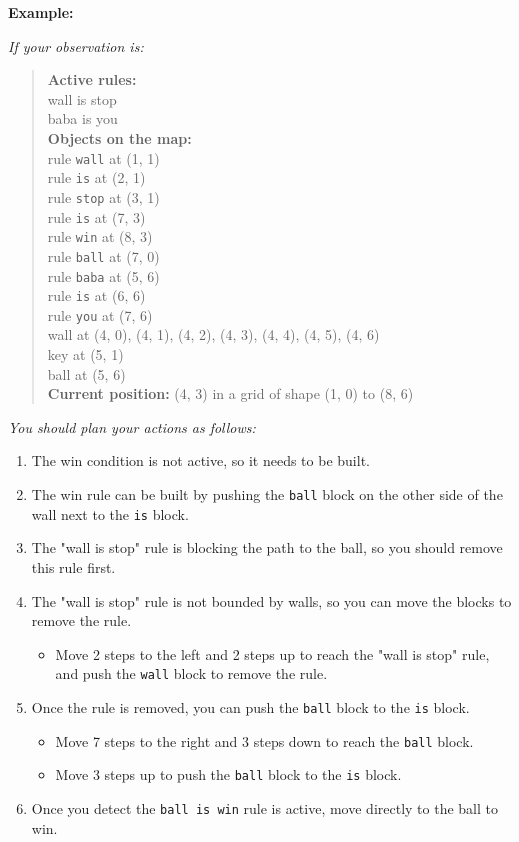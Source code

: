 \begin{GreenBox}[frametitle={\textbf{Iteration 3 Baba-is-ai Prompt}}]
\textbf{Example:}

\textit{If your observation is:}
\begin{quote}
\textbf{Active rules:} \\
wall is stop \\
baba is you \\

\textbf{Objects on the map:} \\
rule \texttt{wall} at (1, 1) \\
rule \texttt{is} at (2, 1) \\
rule \texttt{stop} at (3, 1) \\
rule \texttt{is} at (7, 3) \\
rule \texttt{win} at (8, 3) \\
rule \texttt{ball} at (7, 0) \\
rule \texttt{baba} at (5, 6) \\
rule \texttt{is} at (6, 6) \\
rule \texttt{you} at (7, 6) \\
wall at (4, 0), (4, 1), (4, 2), (4, 3), (4, 4), (4, 5), (4, 6) \\
key at (5, 1) \\
ball at (5, 6) \\

\textbf{Current position:} (4, 3) in a grid of shape (1, 0) to (8, 6)
\end{quote}

\textit{You should plan your actions as follows:}
\begin{enumerate}
    \item The win condition is not active, so it needs to be built.
    \item The win rule can be built by pushing the \texttt{ball} block on the other side of the wall next to the \texttt{is} block.
    \item The "wall is stop" rule is blocking the path to the ball, so you should remove this rule first.
    \item The "wall is stop" rule is not bounded by walls, so you can move the blocks to remove the rule.
    \begin{itemize}
        \item Move 2 steps to the left and 2 steps up to reach the "wall is stop" rule, and push the \texttt{wall} block to remove the rule.
    \end{itemize}
    \item Once the rule is removed, you can push the \texttt{ball} block to the \texttt{is} block.
    \begin{itemize}
        \item Move 7 steps to the right and 3 steps down to reach the \texttt{ball} block.
        \item Move 3 steps up to push the \texttt{ball} block to the \texttt{is} block.
    \end{itemize}
    \item Once you detect the \texttt{ball is win} rule is active, move directly to the ball to win.
\end{enumerate}


\end{GreenBox}
